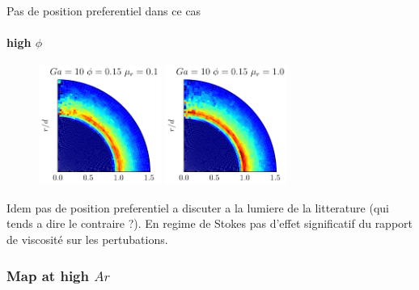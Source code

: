 
Pas de position preferentiel dans ce cas

\paragraph{high $\phi$}
\begin{figure}
\centering
\includegraphics[width=4cm]{image/HOMOGENEOUS/fDrop/Pnst_mu_r_0_1_Ga_10_PHI_0_15}
\includegraphics[width=4cm]{image/HOMOGENEOUS/fDrop/Pnst_mu_r_1_0_Ga_10_PHI_0_15}
\end{figure}

Idem pas de position preferentiel a discuter a la lumiere de la litterature (qui tends a dire le contraire ?). En regime de Stokes pas d'effet significatif du rapport de viscosité sur les pertubations. 







\subsubsection{Map at high $Ar$}

